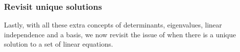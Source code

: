 \begin{comment} 
Optionally: Gram--Schmidt (probably not here as would confuse the aims of lin indep, next section); and something on change of basis, recalling quadratics.
\end{comment}








\subsubsection{Revisit unique solutions}
Lastly, with all these extra concepts of determinants, eigenvalues,  linear independence and a basis, we now revisit the issue of when there is a unique solution to a set of linear equations.


